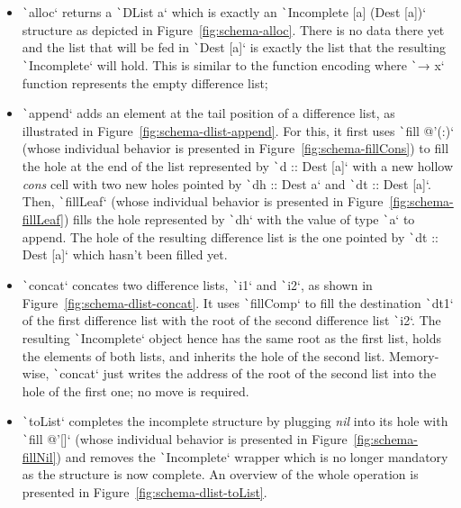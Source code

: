 \documentclass[english]{jflart}
\begin{document}


\begin{itemize}
  \item \texttt`alloc` returns a
    \texttt`DList a` which is exactly an
    \texttt`Incomplete [a] (Dest [a])` structure as
    depicted in Figure~\ref{fig:schema-alloc}. There is no data
    there yet and the list that will be fed in \texttt`Dest [a]` is exactly the list that the
    resulting \texttt`Incomplete` will hold. This is
    similar to the function encoding where \texttt`\x → x` function represents the empty difference list;
    

  \item \texttt`append` adds an element at the tail
    position of a difference list, as illustrated in Figure~\ref{fig:schema-dlist-append}. For this, it first uses
    \texttt`fill @'(:)` (whose individual behavior is presented in Figure~\ref{fig:schema-fillCons}) to fill the hole at the end of the list represented by 
    \texttt`d :: Dest [a]` with a new hollow \emph{cons}
    cell with two new holes pointed by \texttt`dh :: Dest a` and \texttt`dt :: Dest [a]`. Then,
    \texttt`fillLeaf` (whose individual behavior is presented in Figure~\ref{fig:schema-fillLeaf}) fills the hole represented by
    \texttt`dh` with the value
    of type \texttt`a`
    to append. The hole of the resulting difference list is the one pointed by \texttt`dt :: Dest [a]` which hasn't been filled yet.

  \item \texttt`concat` concates two difference lists,
    \texttt`i1` and \texttt`i2`, as shown in Figure~\ref{fig:schema-dlist-concat}. It uses \texttt`fillComp` to fill the destination \texttt`dt1`
    of the first difference list with the
    root of the second difference list \texttt`i2`. The resulting \texttt`Incomplete`
    object hence has the same root as the first list, holds the
    elements of both lists, and inherits the hole of the second list. Memory-wise,
    \texttt`concat` just writes the address of the root
    of the second list into the hole of the first one; no move is
    required.

  \item \texttt`toList` completes the incomplete structure by plugging \emph{nil} into its hole with \texttt`fill @'[]` (whose individual behavior is presented in Figure~\ref{fig:schema-fillNil}) and removes the \texttt`Incomplete` wrapper which is no longer mandatory as the structure is now complete. An overview of the whole operation is presented in Figure~\ref{fig:schema-dlist-toList}.
\end{itemize}
\end{document}
